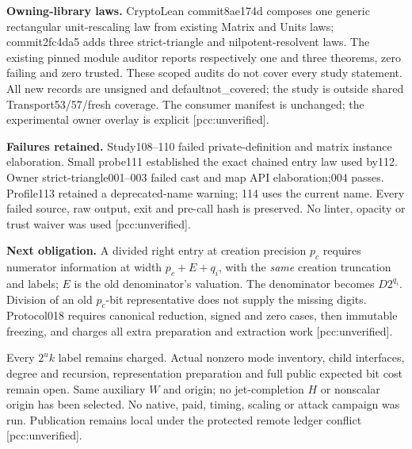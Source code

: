 \documentclass[10pt]{article}
\begin{document}
\textbf{Owning-library laws.} CryptoLean commit8ae174d composes one generic
rectangular unit-rescaling law from existing Matrix and Units laws;
commit2fc4da5 adds three strict-triangle and nilpotent-resolvent laws.
The existing pinned module auditor reports respectively one and three
theorems, zero failing and zero trusted. These scoped audits do not cover
every study statement. All new records are unsigned and defaultnot\_covered;
the study is outside shared Transport53/57/fresh coverage. The consumer
manifest is unchanged; the experimental owner overlay is explicit
[pcc:unverified].

\textbf{Failures retained.} Study108--110 failed private-definition and
matrix instance elaboration. Small probe111 established the exact chained
entry law used by112. Owner strict-triangle001--003 failed cast and map
API elaboration;004 passes. Profile113 retained a deprecated-name warning;
114 uses the current name. Every failed source, raw output, exit and
pre-call hash is preserved. No linter, opacity or trust waiver was used
[pcc:unverified].

\textbf{Next obligation.} A divided right entry at creation precision
$p_c$ requires numerator information at width $p_c+E+q_i$, with the
\emph{same} creation truncation and labels; $E$ is the old denominator's
valuation. The denominator becomes $D2^{q_i}$. Division of an old
$p_c$-bit representative does not supply the missing digits. Protocol018
requires canonical reduction, signed and zero cases, then immutable
freezing, and charges all extra preparation and extraction work
[pcc:unverified].

Every $2^u k$ label remains charged. Actual nonzero mode inventory, child
interfaces, degree and recursion, representation preparation and full
public expected bit cost remain open. Same auxiliary $W$ and origin;
no jet-completion $H$ or nonscalar origin has been selected. No native,
paid, timing, scaling or attack campaign was run. Publication remains
local under the protected remote ledger conflict [pcc:unverified].
\end{document}

